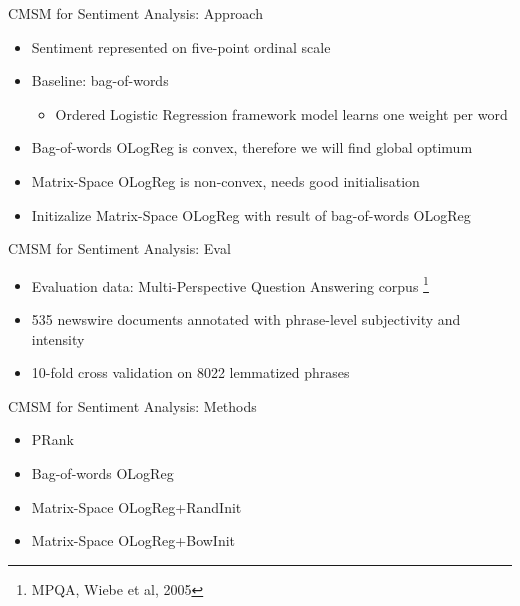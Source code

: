 \documentclass[12pt,a4paper]{beamer}
\begin{document}
\begin{frame}{CMSM for Sentiment Analysis: Approach}
\begin{itemize}
\item Sentiment represented on five-point ordinal scale
\item Baseline: bag-of-words
\begin{itemize}
    \item Ordered Logistic Regression framework model learns one weight per word
\end{itemize}
\item Bag-of-words OLogReg is convex, therefore we will find global optimum
\item Matrix-Space OLogReg is non-convex, needs good initialisation
\item Initizalize Matrix-Space OLogReg with result of bag-of-words OLogReg
\end{itemize}
\end{frame}


\begin{frame}{CMSM for Sentiment Analysis: Eval}
\begin{itemize}
\item Evaluation data: Multi-Perspective Question Answering corpus \footnote{MPQA, Wiebe et al, 2005}
\item 535 newswire documents annotated with phrase-level subjectivity and intensity
\item 10-fold cross validation on 8022 lemmatized phrases
\end{itemize}
\end{frame}


\begin{frame}{CMSM for Sentiment Analysis: Methods}
\begin{itemize}
\item PRank
\item Bag-of-words OLogReg
\item Matrix-Space OLogReg+RandInit
\item Matrix-Space OLogReg+BowInit
\end{itemize}
\end{frame}
\end{document}
